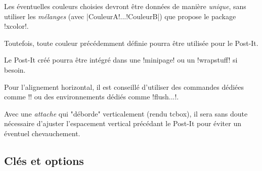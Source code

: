 \documentclass[french,a4paper,11pt]{article}
\begin{document}
\begin{DemoCode}[]
\begin{PostIt}
\lipsum[1][1-2]
\end{PostIt}
\end{DemoCode}

\begin{DemoCode}[]
\begin{PostIt}[Rendu=tikz]
	\lipsum[1][1-2]
\end{PostIt}
\begin{PostIt}[Rendu=tikzv2]
	\lipsum[1][1-2]
\end{PostIt}
\end{DemoCode}

\begin{tipblock}
Les éventuelles couleurs choisies devront être données de manière \textit{unique}, sans utiliser les \textit{mélanges} (avec \motcletex|CouleurA!...!CouleurB|) que propose le package \packagetex!xcolor!. 

Toutefois, toute couleur précédemment définie pourra être utilisée pour le Post-It.
\end{tipblock}

\begin{tipblock}
Le Post-It créé pourra être intégré dans une \motcletex!minipage! ou un \motcletex!wrapstuff! si besoin.

Pour l'alignement horizontal, il est conseillé d'utiliser des commandes dédiées comme \motcletex!\hfill! ou des environnements dédiés comme \motcletex!flush...!.
\end{tipblock}

\begin{warningblock}
Avec une \textit{attache} qui "déborde" verticalement (rendu \textsf{tcbox}), il sera sans doute nécessaire d'ajuster l'espacement vertical précédant le Post-It pour éviter un éventuel chevauchement.
\end{warningblock}

\subsection{Clés et options}
\end{document}
